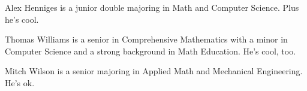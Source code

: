 \documentclass[12pt]{article}
\begin{document}
  Alex Henniges is a junior double majoring in Math and Computer Science. Plus he's cool. \newline
  
  \noindent Thomas Williams is a senior in Comprehensive Mathematics with a minor in Computer Science and a strong background in Math Education. He's cool, too. \newline
  
  \noindent Mitch Wilson is a senior majoring in Applied Math and Mechanical Engineering. He's ok. 
\end{document}
